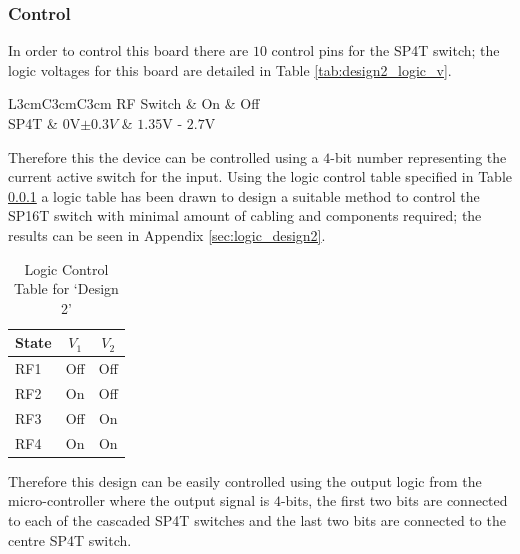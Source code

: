 \documentclass[12pt,openany,a4paper]{book}
\begin{document}
\subsubsection{Control}
In order to control this  board there are $10$ control pins for the SP4T switch; the logic voltages for this board are detailed in Table \ref{tab:design2_logic_v}.
\begin{table}[H]
	\centering
	\begin{tabular}{L{3cm}C{3cm}C{3cm}}
	\hline
	RF Switch & On & Off\\
	\hline
	SP4T & $0$V$\pm 0.3V$ & $1.35$V - $2.7$V \\
	\hline	
	\end{tabular}
	\caption{Logic Voltage Control}
	\label{tab:design2_logic_v}
\end{table}
Therefore this the device can be controlled using a $4$-bit number representing the current active switch for the input. Using the logic control table specified in Table \ref{} a logic table has been drawn to design a suitable method to control the SP16T switch with minimal amount of cabling and components required; the results can be seen in Appendix \ref{sec:logic_design2}. 
\begin{table}[H]
	\centering
	\begin{tabular}{l c c }
		\hline
		State & $V_1$ & $V_2$\\
		\hline
		RF1 & Off & Off \\
		RF2 & On & Off \\
		RF3 & Off & On\\
		RF4 & On & On		\\
		\hline
	\end{tabular}
    \caption{Logic Control Table for `Design 2'} \label{tab:logic-cont-design2}
\end{table}
Therefore this design can be easily controlled using the output logic from the micro-controller where the output signal is $4$-bits, the first two bits are connected to each of the cascaded SP4T switches and the last two bits are connected to the centre SP4T switch.
\end{document}
